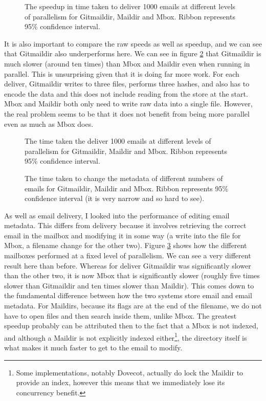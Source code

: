 \begin{figure}[h]
    \centering
    
    \caption{The speedup in time taken to deliver 1000 emails at different levels of parallelism for Gitmaildir, Maildir and Mbox. Ribbon represents 95\% confidence interval.}
    \label{fig:tdpp_speedup_combined}
\end{figure}

It is also important to compare the raw speeds as well as speedup, and we can see that Gitmaildir also underperforms here. We can see in figure \ref{fig:tdpp_combined} that Gitmaildir is much slower (around ten times) than Mbox and Maildir even when running in parallel. This is unsurprising given that it is doing far more work. For each deliver, Gitmaildir writes to three files, performs three hashes, and also has to encode the data and this does not include reading from the store at the start. Mbox and Maildir both only need to write raw data into a single file. However, the real problem seems to be that it does not benefit from being more parallel even as much as Mbox does.

\begin{figure}[h]
    \centering
    
    \caption{The time taken the deliver 1000 emails at different levels of parallelism for Gitmaildir, Maildir and Mbox. Ribbon represents 95\% confidence interval.}
    \label{fig:tdpp_combined}
\end{figure}

\begin{figure}[h]
    \centering
    
  \caption{The time taken to change the metadata of different numbers of emails for Gitmaildir, Maildir and Mbox. Ribbon represents 95\% confidence interval (it is very narrow and so hard to see).}
    \label{fig:tmp_combined}
\end{figure}

As well as email delivery, I looked into the performance of editing email metadata. This differs from delivery because it involves retrieving the correct email in the mailbox and modifying it in some way (a write into the file for Mbox, a filename change for the other two). Figure \ref{fig:tmp_combined} shows how the different mailboxes performed at a fixed level of parallelism. We can see a very different result here than before. Whereas for deliver Gitmaildir was significantly slower than the other two, it is now Mbox that is significantly slower (roughly five times slower than Gitmaildir and ten times slower than Maildir). This comes down to the fundamental difference between how the two systems store email and email metadata. For Maildirs, because its flags are at the end of the filename, we do not have to open files and then search inside them, unlike Mbox. The greatest speedup probably can be attributed then to the fact that a Mbox is not indexed, and although a Maildir is not explicitly indexed either\footnote{Some implementations, notably Dovecot\cite{dovecot_maildir}, actually do lock the Maildir to provide an index, however this means that we immediately lose its concurrency benefit.}, the directory itself is what makes it much faster to get to the email to modify.


